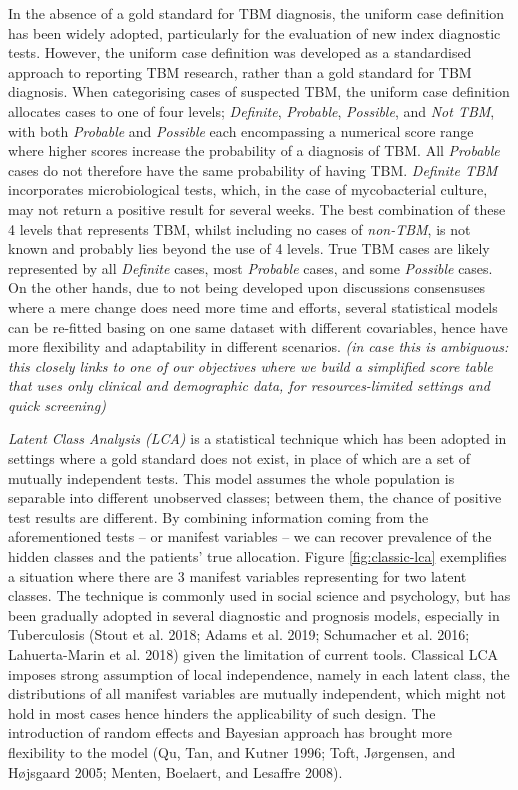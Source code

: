 \documentclass[
]{article}
\begin{document}
In the absence of a gold standard for TBM diagnosis, the uniform case definition has been widely adopted, particularly for the evaluation of new index diagnostic tests. However, the uniform case definition was developed as a standardised approach to reporting TBM research, rather than a gold standard for TBM diagnosis. When categorising cases of suspected TBM, the uniform case definition allocates cases to one of four levels; \emph{Definite}, \emph{Probable}, \emph{Possible}, and \emph{Not TBM}, with both \emph{Probable} and \emph{Possible} each encompassing a numerical score range where higher scores increase the probability of a diagnosis of TBM. All \emph{Probable} cases do not therefore have the same probability of having TBM. \emph{Definite TBM} incorporates microbiological tests, which, in the case of mycobacterial culture, may not return a positive result for several weeks. The best combination of these 4 levels that represents TBM, whilst including no cases of \emph{non-TBM}, is not known and probably lies beyond the use of 4 levels. True TBM cases are likely represented by all \emph{Definite} cases, most \emph{Probable} cases, and some \emph{Possible} cases. On the other hands, due to not being developed upon discussions consensuses where a mere change does need more time and efforts, several statistical models can be re-fitted basing on one same dataset with different covariables, hence have more flexibility and adaptability in different scenarios. \emph{(in case this is ambiguous: this closely links to one of our objectives where we build a simplified score table that uses only clinical and demographic data, for resources-limited settings and quick screening)}

\emph{Latent Class Analysis (LCA)} is a statistical technique which has been adopted in settings where a gold standard does not exist, in place of which are a set of mutually independent tests. This model assumes the whole population is separable into different unobserved classes; between them, the chance of positive test results are different. By combining information coming from the aforementioned tests -- or manifest variables -- we can recover prevalence of the hidden classes and the patients' true allocation. Figure \ref{fig:classic-lca} exemplifies a situation where there are 3 manifest variables representing for two latent classes. The technique is commonly used in social science and psychology, but has been gradually adopted in several diagnostic and prognosis models, especially in Tuberculosis (Stout et al. 2018; Adams et al. 2019; Schumacher et al. 2016; Lahuerta-Marin et al. 2018) given the limitation of current tools. Classical LCA imposes strong assumption of local independence, namely in each latent class, the distributions of all manifest variables are mutually independent, which might not hold in most cases hence hinders the applicability of such design. The introduction of random effects and Bayesian approach has brought more flexibility to the model (Qu, Tan, and Kutner 1996; Toft, Jørgensen, and Højsgaard 2005; Menten, Boelaert, and Lesaffre 2008).
\end{document}
